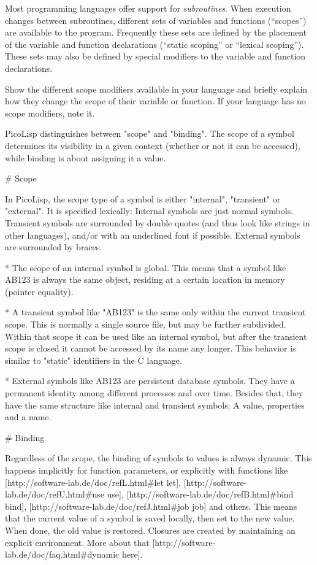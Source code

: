 Most programming languages offer support for
\emph{subroutines}. When execution changes
between subroutines, different sets of variables and functions
(``scopes'') are available to the program. Frequently these sets are
defined by the placement of the variable and function declarations
(``static scoping'' or ``lexical scoping''). These sets may also be
defined by special modifiers to the variable and function declarations.

Show the different scope modifiers available in your language and
briefly explain how they change the scope of their variable or function.
If your language has no scope modifiers, note it.


\begin{wideverbatim}


  PicoLisp distinguishes between "scope" and "binding". The scope of a
  symbol determines its visibility in a given context (whether or not
  it can be accessed), while binding is about assigning it a value.

# Scope

In PicoLisp, the scope type of a symbol is either "internal",
"transient" or "external". It is specified lexically: Internal symbols
are just normal symbols. Transient symbols are surrounded by double
quotes (and thus look like strings in other languages), and/or with an
underlined font if possible. External symbols are surrounded by
braces.

* The scope of an internal symbol is global. This means that a symbol
like AB123 is always the same object, residing at a certain location
in memory (pointer equality).

* A transient symbol like "AB123" is the same only within the current
transient scope. This is normally a single source file, but may be
further subdivided. Within that scope it can be used like an internal
symbol, but after the transient scope is closed it cannot be accessed
by its name any longer. This behavior is similar to "static"
identifiers in the C language.

* External symbols like {AB123} are persistent database symbols. They
have a permanent identity among different processes and over time.
Besides that, they have the same structure like internal and transient
symbols: A value, properties and a name.

# Binding

Regardless of the scope, the binding of symbols to values is always
dynamic. This happens implicitly for function parameters, or
explicitly with functions like
[http://software-lab.de/doc/refL.html#let let],
[http://software-lab.de/doc/refU.html#use use],
[http://software-lab.de/doc/refB.html#bind bind],
[http://software-lab.de/doc/refJ.html#job job] and others. This means
that the current value of a symbol is saved locally, then set to the
new value. When done, the old value is restored. Closures are created
by maintaining an explicit environment. More about that
[http://software-lab.de/doc/faq.html#dynamic here].

\end{wideverbatim}

